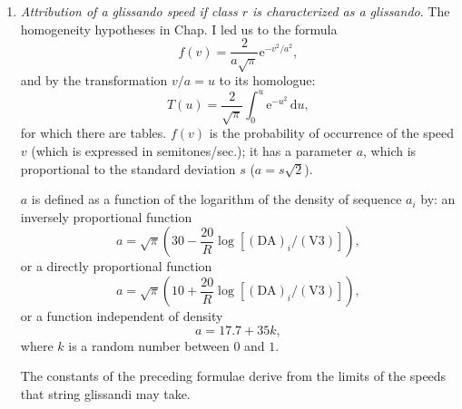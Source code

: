 \documentclass[letterpaper, 11pt]{article}
\begin{document}
\begin{enumerate}
        Just as for the density in 2., we accept a certain memory of or dependence on the preceding pitch played by the same instrument, so that we have
        \[h_u = h_{u-1} \pm z,\]
        where \(z\) is given by the probability formula
        \[P_z = \frac{2}{s} \left( 1 - \frac{z}{s} \right) \, \mathrm{d}z. \tag{See Appendix I.}\]
        \(P_z\) is the probability of the interval \(z\) taken at random from the range \(s\), and \(s\) is expressed as the difference between the highest and lowest pitches that can be played on the instrument.
    \item
        \textit{Attribution of a glissando speed if class \(r\) is characterized as a glissando}.
        The homogeneity hypotheses in Chap. I led us to the formula
        \[f(v) = \frac{2}{a \sqrt{\pi}} \mathrm{e}^{-v^2/a^2},\]
        and by the transformation \(v/a = u\) to its homologue:
        \[T(u) = \frac{2}{\sqrt{\pi}} \int_0^u \mathrm{e}^{-u^2} \, \mathrm{d}u,\]
        for which there are tables.
        \(f(v)\) is the probability of occurrence of the speed \(v\) (which is expressed in semitones/sec.); it has a parameter \(a\), which is proportional to the standard deviation \(s\) (\(a = s \sqrt{2}\)).

        \(a\) is defined as a function of the logarithm of the density of sequence \(a_i\) by: an inversely proportional function
        \[a = \sqrt{\pi} \left( 30 - \frac{20}{R} \log{[(\mathrm{DA})_i / (\mathrm{V3})]} \right),\]
        or a directly proportional function
        \[a = \sqrt{\pi} \left( 10 + \frac{20}{R} \log{[(\mathrm{DA})_i / (\mathrm{V3})]}\right),\]
        or a function independent of density
        \[a = 17.7 + 35k,\]
        where \(k\) is a random number between \(0\) and \(1\).

        The constants of the preceding formulae derive from the limits of the speeds that string glissandi may take.


\end{enumerate}
\end{document}
